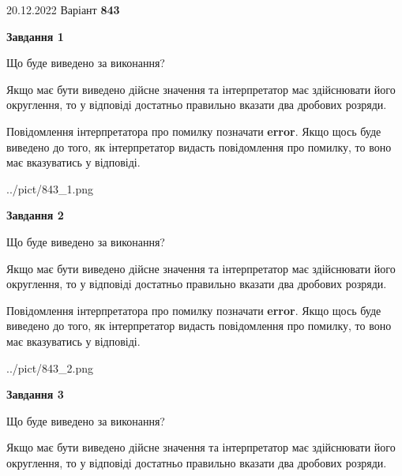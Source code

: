 \documentclass[12pt, ukrainian]{article}
\begin{document}
{20.12.2022 Варіант \No \textbf { 843 }\par}
{
\begin {Large}

{\begin {center}\textbf{Завдання 1}\end {center}}\par
Що буде виведено за виконання? \par

Якщо має бути виведено дійсне значення та інтерпретатор має здійснювати його округлення, 
то у відповіді достатньо правильно вказати два дробових розряди.

Повідомлення інтерпретатора про помилку позначати \textbf{error}.
Якщо щось буде виведено до того, як інтерпретатор видасть повідомлення про помилку, 
то воно має вказуватись у відповіді. \par

\begin{center}
	{../pict/843_1.png}
\end{center}
\newpage

{\begin {center}\textbf{Завдання 2}\end {center}}\par
Що буде виведено за виконання? \par

Якщо має бути виведено дійсне значення та інтерпретатор має здійснювати його округлення, 
то у відповіді достатньо правильно вказати два дробових розряди.

Повідомлення інтерпретатора про помилку позначати \textbf{error}.
Якщо щось буде виведено до того, як інтерпретатор видасть повідомлення про помилку, 
то воно має вказуватись у відповіді. \par

\begin{center}
	{../pict/843_2.png}
\end{center}
\newpage

{\begin {center}\textbf{Завдання 3}\end {center}}\par
Що буде виведено за виконання? \par

Якщо має бути виведено дійсне значення та інтерпретатор має здійснювати його округлення, 
то у відповіді достатньо правильно вказати два дробових розряди.


\end{Large}}
\end{document}
